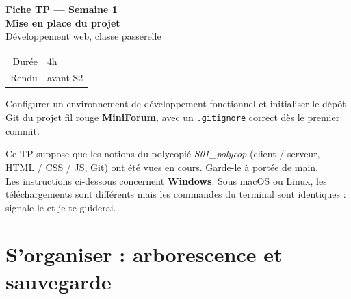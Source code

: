 \documentclass[a4paper,11pt]{article}
\begin{document}

\begin{tcolorbox}[
  colback=accentBlue, colframe=accentBlue,
  arc=4pt, left=12pt, right=12pt, top=10pt, bottom=10pt]
  \begin{minipage}{0.72\linewidth}
    {\color{cfptYellow}\Large\bfseries Fiche TP --- Semaine 1}\\[4pt]
    {\color{white}\Large\bfseries Mise en place du projet}\\[4pt]
    {\color{lightBlue}\normalsize Développement web, classe passerelle}
  \end{minipage}
  \hfill
  \begin{minipage}{0.24\linewidth}
    \raggedleft
    \begin{tabular}{rl}
      \color{lightBlue}\small Durée & \color{white}\small 4h \\
      \color{lightBlue}\small Rendu & \color{white}\small avant S2 \\
    \end{tabular}
  \end{minipage}
\end{tcolorbox}

\vspace{6pt}
\begin{tcolorbox}[definition, title={Objectif du TP}]
Configurer un environnement de développement fonctionnel et initialiser le dépôt Git du projet fil rouge \textbf{MiniForum}, avec un \texttt{.gitignore} correct dès le premier commit.
\end{tcolorbox}

\begin{tcolorbox}[astuce, title={Avant de commencer}]
Ce TP suppose que les notions du polycopié \textit{S01\_polycop} (client / serveur, HTML / CSS / JS, Git) ont été vues en cours. Garde-le à portée de main.\\[3pt]
Les instructions ci-dessous concernent \textbf{Windows}. Sous macOS ou Linux, les téléchargements sont différents mais les commandes du terminal sont identiques : signale-le et je te guiderai.
\end{tcolorbox}

\section{S'organiser : arborescence et sauvegarde}
\end{document}
